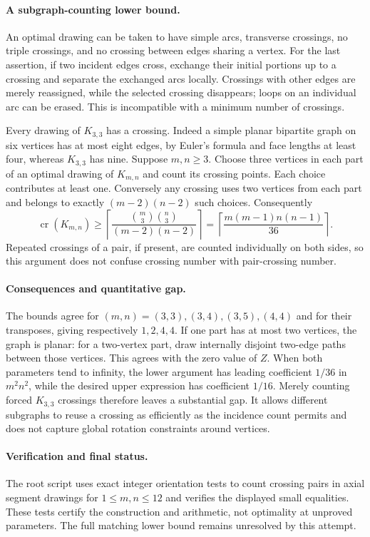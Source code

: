 \documentclass[11pt,a4paper]{article}
\begin{document}
\paragraph{A subgraph-counting lower bound.}
An optimal drawing can be taken to have simple arcs, transverse
crossings, no triple crossings, and no crossing between edges
sharing a vertex. For the last assertion, if two incident edges
cross, exchange their initial portions up to a crossing and
separate the exchanged arcs locally. Crossings with other edges
are merely reassigned, while the selected crossing disappears;
loops on an individual arc can be erased. This is incompatible
with a minimum number of crossings.

Every drawing of $K_{3,3}$ has a crossing. Indeed a simple planar
bipartite graph on six vertices has at most eight edges, by
Euler's formula and face lengths at least four, whereas $K_{3,3}$
has nine. Suppose $m,n\ge3$. Choose three vertices in each part
of an optimal drawing of $K_{m,n}$ and count its crossing points.
Each choice contributes at least one. Conversely any crossing
uses two vertices from each part and belongs to exactly
$(m-2)(n-2)$ such choices. Consequently
\[
 \operatorname{cr}(K_{m,n})\ge
 \left\lceil\frac{\binom m3\binom n3}{(m-2)(n-2)}\right\rceil
 =\left\lceil\frac{m(m-1)n(n-1)}{36}\right\rceil.
\]
Repeated crossings of a pair, if present, are counted individually
on both sides, so this argument does not confuse crossing number
with pair-crossing number.

\paragraph{Consequences and quantitative gap.}
The bounds agree for $(m,n)=(3,3),(3,4),(3,5),(4,4)$ and for
their transposes, giving respectively $1,2,4,4$. If one part has
at most two vertices, the graph is planar: for a two-vertex part,
draw internally disjoint two-edge paths between those vertices.
This agrees with the zero value of $Z$.
When both parameters tend to infinity, the lower argument has
leading coefficient $1/36$ in $m^2n^2$, while the desired upper
expression has coefficient $1/16$. Merely counting forced
$K_{3,3}$ crossings therefore leaves a substantial gap. It allows
different subgraphs to reuse a crossing as efficiently as the
incidence count permits and does not capture global rotation
constraints around vertices.

\paragraph{Verification and final status.}
The root script uses exact integer orientation tests to count
crossing pairs in axial segment drawings for $1\le m,n\le12$
and verifies the displayed small equalities. These tests certify
the construction and arithmetic, not optimality at unproved
parameters. The full matching lower bound remains unresolved
by this attempt.
\end{document}
